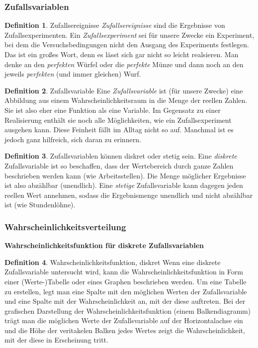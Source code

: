 \documentclass{article}
\theoremstyle{definition}
\newtheorem{definition}{Definition}[subsection]
\theoremstyle{remark}
\begin{document}
\subsubsection{Zufallsvariablen}

\begin{definition}{Zufallsereignisse}
    \textit{Zufallsereignisse} sind die Ergebnisse von Zufallsexperimenten. Ein \textit{Zufallsexperiment} sei für unsere Zwecke ein Experiment, bei dem die Versuchsbedingungen nicht den Ausgang des Experiments festlegen. Das ist ein großes Wort, denn es lässt sich gar nicht so leicht realsieren. Man denke an den \textit{perfekten} Würfel oder die \textit{perfekte} Münze und dann noch an den jeweils \textit{perfekten} (und immer gleichen) Wurf.
\end{definition}

\begin{definition}{Zufallsvariable}
    Eine \textit{Zufallsvariable} ist (für unsere Zwecke) eine Abbildung aus einem Wahrscheinlichkeitsraum in die Menge der reellen Zahlen. Sie ist also eher eine Funktion als eine Variable. Im Gegensatz zu einer Realisierung enthält sie noch alle Möglichkeiten, wie ein Zufallsexperiment ausgehen kann. Diese Feinheit fällt im Alltag nicht so auf. Manchmal ist es jedoch ganz hilfreich, sich daran zu erinnern.
\end{definition}

\begin{definition}{}
    Zufallsvariablen können diskret oder stetig sein. Eine \textit{diskrete} Zufallsvariable ist so beschaffen, dass der Wertebereich durch ganze Zahlen beschrieben werden kann (wie Arbeitsstellen). Die Menge möglicher Ergebnisse ist also abzählbar (unendlich). Eine \textit{stetige} Zufallsvariable kann dagegen jeden reellen Wert annehmen, sodass die Ergebnismenge unendlich und nicht abzählbar ist (wie Stundenlöhne).
\end{definition}

\pagebreak

\subsubsection{Wahrscheinlichkeitsverteilung}

\textbf{Wahrscheinlichkeitsfunktion für diskrete Zufallsvariablen}
\begin{definition}{Wahrscheinlichkeitsfunktion, diskret}
    Wenn eine diskrete Zufallsvariable untersucht wird, kann die Wahrscheinlichkeitsfunktion in Form einer (Werte-)Tabelle oder eines Graphen beschrieben werden. Um eine Tabelle zu erstellen, legt man eine Spalte mit den möglichen Werten der Zufallsvariable und eine Spalte mit der Wahrscheinlichkeit an, mit der diese auftreten. Bei der grafischen Darstellung der Wahrscheinlichkeitsfunktion (einem Balkendiagramm) trägt man die möglichen Werte der Zufallsvariable auf der Horizontalachse ein und die Höhe der veritakelen Balken jedes Wertes zeigt die Wahrscheinlichkeit, mit der diese in Erscheinung tritt.
\end{definition}
\end{document}
